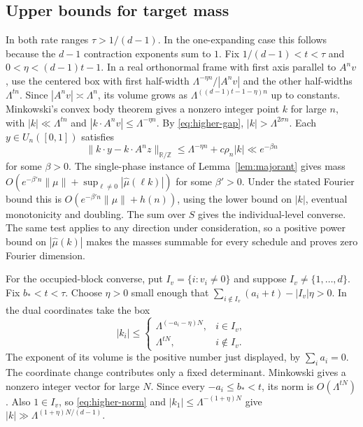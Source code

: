 \documentclass[11pt,a4paper,reqno]{amsart}
\theoremstyle{definition}
\theoremstyle{remark}
\numberwithin{equation}{section}
\begin{document}
\subsection{Upper bounds for target mass}

In both rate ranges \(\tau>1/(d-1)\). In the one-expanding case this follows because the \(d-1\) contraction exponents sum to \(1\). Fix \(1/(d-1)<t<\tau\) and \(0<\eta<(d-1)t-1\). In a real orthonormal frame with first axis parallel to \(A^n v\), use the centered box with first half-width \(\Lambda^{-\eta n}/|A^n v|\) and the other half-widths \(\Lambda^{tn}\). Since \(|A^n v|\asymp\Lambda^n\), its volume grows as \(\Lambda^{((d-1)t-1-\eta)n}\) up to constants. Minkowski's convex body theorem gives a nonzero integer point \(k\) for large \(n\), with \(|k|\ll\Lambda^{tn}\) and \(|k\cdot A^n v|\le\Lambda^{-\eta n}\). By \eqref{eq:higher-gap}, \(|k|>\Lambda^{2\sigma n}\). Each \(y\in U_n([0,1])\) satisfies
\begin{equation}\label{eq:higher-one-phase}
 \|k\cdot y-k\cdot A^n z\|_{\mathbb R/\mathbb Z}
 \le \Lambda^{-\eta n}+c\rho_n|k|\ll e^{-\beta n}
\end{equation}
for some \(\beta>0\). The single-phase instance of Lemma~\ref{lem:majorant} gives mass \(O(e^{-\beta' n}\|\mu\|+\sup_{\ell\ne0}|\widehat\mu(\ell k)|)\) for some \(\beta'>0\). Under the stated Fourier bound this is \(O(e^{-\beta' n}\|\mu\|+h(n))\), using the lower bound on \(|k|\), eventual monotonicity and doubling. The sum over \(S\) gives the individual-level converse. The same test applies to any direction under consideration, so a positive power bound on \(|\widehat\mu(k)|\) makes the masses summable for every schedule and proves zero Fourier dimension.

For the occupied-block converse, put \(I_v=\{i:v_i\ne0\}\) and suppose \(I_v\ne\{1,\ldots,d\}\). Fix \(b_*<t<\tau\). Choose \(\eta>0\) small enough that \(\sum_{i\notin I_v}(a_i+t)-|I_v|\eta>0\). In the dual coordinates take the box
\[
 |k_i|\le
 \begin{cases}
 \Lambda^{(-a_i-\eta)N},&i\in I_v,\\
 \Lambda^{tN},&i\notin I_v .
 \end{cases}
\]
The exponent of its volume is the positive number just displayed, by \(\sum_i a_i=0\). The coordinate change contributes only a fixed determinant. Minkowski gives a nonzero integer vector for large \(N\). Since every \(-a_i\le b_*<t\), its norm is \(O(\Lambda^{tN})\). Also \(1\in I_v\), so \eqref{eq:higher-norm} and \(|k_1|\le\Lambda^{-(1+\eta)N}\) give \(|k|\gg\Lambda^{(1+\eta)N/(d-1)}\).
\end{document}
